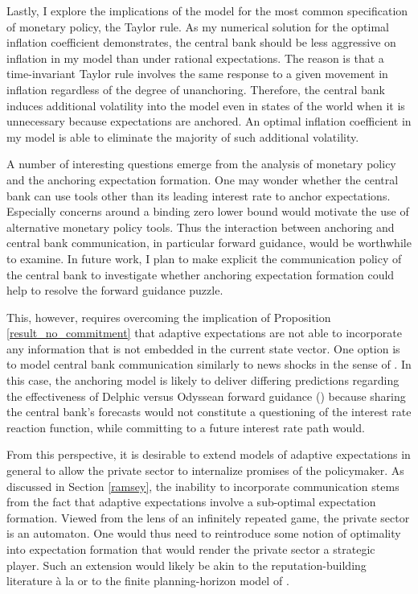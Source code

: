 \documentclass[11pt]{article}
\renewcommand{\[}{\begin{equation}}
\renewcommand{\]}{\end{equation}}
\begin{document}
Lastly, I explore the implications of the model for the most common specification of monetary policy, the Taylor rule. As my numerical solution for the optimal inflation coefficient demonstrates, the central bank should be less aggressive on inflation in my model than under rational expectations. The reason is that a time-invariant Taylor rule involves the same response to a given movement in inflation regardless of the degree of unanchoring. Therefore, the central bank induces additional volatility into the model even in states of the world when it is unnecessary because expectations are anchored. An optimal inflation coefficient in my model is able to eliminate the majority of such additional volatility.

A number of interesting questions emerge from the analysis of monetary policy and the anchoring expectation formation. One may wonder whether the central bank can use tools other than its leading interest rate to anchor expectations. Especially concerns around a binding zero lower bound would motivate the use of alternative monetary policy tools. Thus the interaction between anchoring and central bank communication, in particular forward guidance, would be worthwhile to examine. In future work, I plan to make explicit the communication policy of the central bank to investigate whether anchoring expectation formation could help to resolve the forward guidance puzzle. 

This, however, requires overcoming the implication of Proposition \ref{result_no_commitment} that adaptive expectations are not able to incorporate any information that is not embedded in the current state vector. One option is to model central bank communication similarly to news shocks in the sense of \cite{beaudry2006stock}. In this case, the anchoring model is likely to deliver differing predictions regarding the effectiveness of Delphic versus Odyssean forward guidance (\cite{campbell2012macroeconomic}) because sharing the central bank's forecasts would not constitute a questioning of the interest rate reaction function, while committing to a future interest rate path would.

From this perspective, it is desirable to extend models of adaptive expectations in general to allow the private sector to internalize promises of the policymaker. As discussed in Section \ref{ramsey}, the inability to incorporate communication stems from the fact that adaptive expectations involve a sub-optimal expectation formation. Viewed from the lens of an infinitely repeated game, the private sector is an automaton. One would thus need to reintroduce some notion of optimality into expectation formation that would render the private sector a strategic player. Such an extension would likely be akin to the reputation-building literature \`a la \cite{cho1995induction} or to the finite planning-horizon model of \cite{woodford2019monetary}. 
\end{document}
